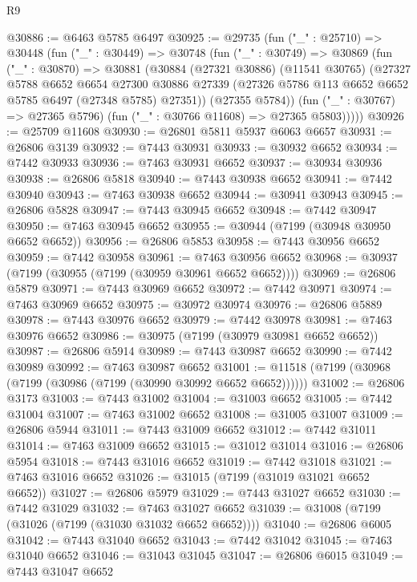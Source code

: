 \begin{lexlean}{R9}
\begin{coremodule}
@30886 := @6463 @5785 @6497
@30925 := @29735
    (fun ("_" : @25710) =>
    @30448
      (fun ("_" : @30449) =>
      @30748
        (fun ("_" : @30749) =>
        @30869
          (fun ("_" : @30870) =>
          @30881
            (@30884
              (@27321 @30886)
              (@11541 @30765)
              (@27327
                @5788
                @6652
                @6654
                @27300
                @30886
                @27339
                (@27326 @5786 @113 @6652 @6652 @5785 @6497 (@27348 @5785) @27351))
              (@27355 @5784))
            (fun ("_" : @30767) => @27365 @5796)
            (fun ("_" : @30766 @11608) => @27365 @5803)))))
@30926 := @25709 @11608
@30930 := @26801 @5811 @5937 @6063 @6657
@30931 := @26806 @3139
@30932 := @7443 @30931
@30933 := @30932 @6652
@30934 := @7442 @30933
@30936 := @7463 @30931 @6652
@30937 := @30934 @30936
@30938 := @26806 @5818
@30940 := @7443 @30938 @6652
@30941 := @7442 @30940
@30943 := @7463 @30938 @6652
@30944 := @30941 @30943
@30945 := @26806 @5828
@30947 := @7443 @30945 @6652
@30948 := @7442 @30947
@30950 := @7463 @30945 @6652
@30955 := @30944 (@7199 (@30948 @30950 @6652 @6652))
@30956 := @26806 @5853
@30958 := @7443 @30956 @6652
@30959 := @7442 @30958
@30961 := @7463 @30956 @6652
@30968 := @30937 (@7199 (@30955 (@7199 (@30959 @30961 @6652 @6652))))
@30969 := @26806 @5879
@30971 := @7443 @30969 @6652
@30972 := @7442 @30971
@30974 := @7463 @30969 @6652
@30975 := @30972 @30974
@30976 := @26806 @5889
@30978 := @7443 @30976 @6652
@30979 := @7442 @30978
@30981 := @7463 @30976 @6652
@30986 := @30975 (@7199 (@30979 @30981 @6652 @6652))
@30987 := @26806 @5914
@30989 := @7443 @30987 @6652
@30990 := @7442 @30989
@30992 := @7463 @30987 @6652
@31001 := @11518 (@7199 (@30968 (@7199 (@30986 (@7199 (@30990 @30992 @6652 @6652))))))
@31002 := @26806 @3173
@31003 := @7443 @31002
@31004 := @31003 @6652
@31005 := @7442 @31004
@31007 := @7463 @31002 @6652
@31008 := @31005 @31007
@31009 := @26806 @5944
@31011 := @7443 @31009 @6652
@31012 := @7442 @31011
@31014 := @7463 @31009 @6652
@31015 := @31012 @31014
@31016 := @26806 @5954
@31018 := @7443 @31016 @6652
@31019 := @7442 @31018
@31021 := @7463 @31016 @6652
@31026 := @31015 (@7199 (@31019 @31021 @6652 @6652))
@31027 := @26806 @5979
@31029 := @7443 @31027 @6652
@31030 := @7442 @31029
@31032 := @7463 @31027 @6652
@31039 := @31008 (@7199 (@31026 (@7199 (@31030 @31032 @6652 @6652))))
@31040 := @26806 @6005
@31042 := @7443 @31040 @6652
@31043 := @7442 @31042
@31045 := @7463 @31040 @6652
@31046 := @31043 @31045
@31047 := @26806 @6015
@31049 := @7443 @31047 @6652

\end{coremodule}
\end{lexlean}
